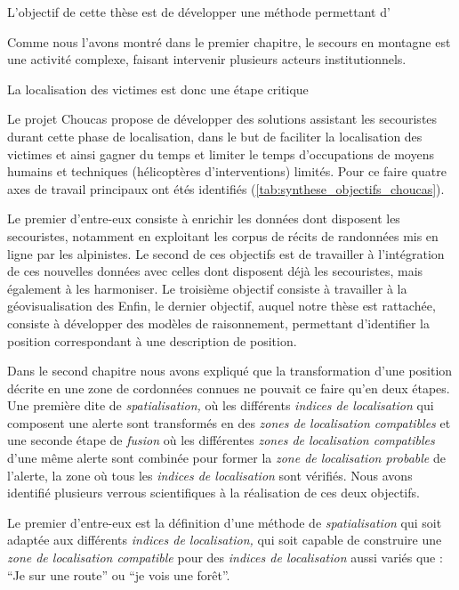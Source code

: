 L'objectif de cette thèse est de développer une méthode permettant d'

Comme nous l'avons montré dans le premier chapitre, le secours en
montagne est une activité complexe, faisant intervenir plusieurs
acteurs institutionnels.

La localisation des victimes est donc une étape critique

Le projet Choucas propose de développer des solutions assistant les
secouristes durant cette phase de localisation, dans le but de
faciliter la localisation des victimes et ainsi gagner du temps et
limiter le temps d'occupations de moyens humains et techniques
(hélicoptères d'interventions) limités. Pour ce faire quatre axes de
travail principaux ont étés identifiés
(\autoref{tab:synthese_objectifs_choucas}).

Le premier d'entre-eux consiste à enrichir les données dont disposent
les secouristes, notamment en exploitant les corpus de récits de
randonnées mis en ligne par les alpinistes. Le second de ces objectifs
est de travailler à l'intégration de ces nouvelles données avec celles
dont disposent déjà les secouristes, mais également à les
harmoniser. Le troisième objectif consiste à travailler à la
géovisualisation des Enfin, le dernier objectif, auquel notre thèse
est rattachée, consiste à développer des modèles de raisonnement,
permettant d'identifier la position correspondant à une description de
position.

Dans le second chapitre nous avons expliqué que la transformation
d'une position décrite en une zone de cordonnées connues ne pouvait ce
faire qu'en deux étapes. Une première dite de \emph{spatialisation,}
où les différents \emph{indices de localisation} qui composent une
alerte sont transformés en des \emph{zones de localisation
  compatibles} et une seconde étape de \emph{fusion} où les
différentes \emph{zones de localisation compatibles} d'une même alerte
sont combinée pour former la \emph{zone de localisation probable} de
l'alerte, \ie la zone où tous les \emph{indices de localisation} sont
vérifiés. Nous avons identifié plusieurs verrous scientifiques à la
réalisation de ces deux objectifs.

Le premier d'entre-eux est la définition d'une méthode de
\emph{spatialisation} qui soit adaptée aux différents \emph{indices de
  localisation,} \ie qui soit capable de construire une \emph{zone de
  localisation compatible} pour des \emph{indices de localisation}
aussi variés que : \enquote{Je sur une route} ou \enquote{je vois une
  forêt}.

